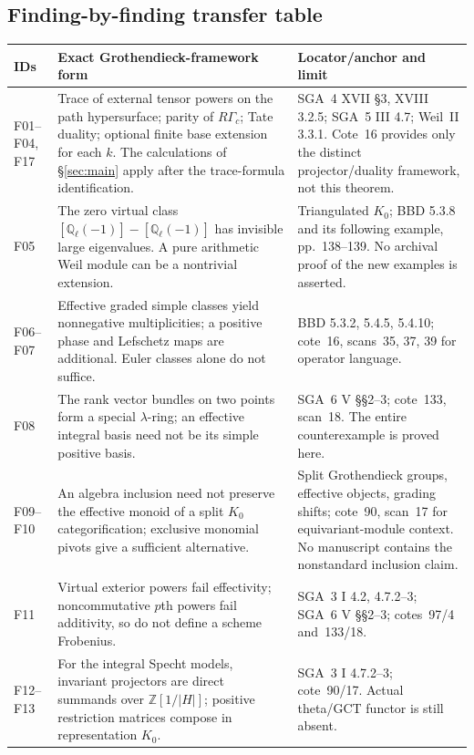 \documentclass[11pt,a4paper]{article}
\newcommand{\Q}{\mathbb Q}\newcommand{\Z}{\mathbb Z}\newcommand{\C}{\mathbb C}\newcommand{\N}{\mathbb N}\newcommand{\F}{\mathbb F}
\theoremstyle{named}\newtheorem{finding}{Finding}[section]
\theoremstyle{definition}\newtheorem{definition}[finding]{Definition}
\theoremstyle{remark}\newtheorem{remark}[finding]{Remark}
\begin{document}
\subsection{Finding-by-finding transfer table}
{\small\begin{longtable}{p{.12\linewidth}p{.48\linewidth}p{.32\linewidth}}
\toprule IDs&Exact Grothendieck-framework form&Locator/anchor and limit\\\midrule\endhead
F01--F04, F17&Trace of external tensor powers on the path hypersurface; parity of $R\Gamma_c$; Tate duality; optional finite base extension for each $k$. The calculations of \S\ref{sec:main} apply after the trace-formula identification.&SGA~4 XVII \S3, XVIII 3.2.5; SGA~5 III 4.7; Weil~II 3.3.1. Cote~16 provides only the distinct projector/duality framework, not this theorem.\\
F05&The zero virtual class $[\Q_\ell(-1)]-[\Q_\ell(-1)]$ has invisible large eigenvalues. A pure arithmetic Weil module can be a nontrivial extension.&Triangulated $K_0$; BBD 5.3.8 and its following example, pp.~138--139. No archival proof of the new examples is asserted.\\
F06--F07&Effective graded simple classes yield nonnegative multiplicities; a positive phase and Lefschetz maps are additional. Euler classes alone do not suffice.&BBD 5.3.2, 5.4.5, 5.4.10; cote~16, scans~35, 37, 39 for operator language.\\
F08&The rank vector bundles on two points form a special $\lambda$-ring; an effective integral basis need not be its simple positive basis.&SGA~6 V \S\S2--3; cote~133, scan~18. The entire counterexample is proved here.\\
F09--F10&An algebra inclusion need not preserve the effective monoid of a split $K_0$ categorification; exclusive monomial pivots give a sufficient alternative.&Split Grothendieck groups, effective objects, grading shifts; cote~90, scan~17 for equivariant-module context. No manuscript contains the nonstandard inclusion claim.\\
F11&Virtual exterior powers fail effectivity; noncommutative $p$th powers fail additivity, so do not define a scheme Frobenius.&SGA~3 I 4.2, 4.7.2--3; SGA~6 V \S\S2--3; cotes~97/4 and~133/18.\\
F12--F13&For the integral Specht models, invariant projectors are direct summands over $\Z[1/|H|]$; positive restriction matrices compose in representation $K_0$.&SGA~3 I 4.7.2--3; cote~90/17. Actual theta/GCT functor is still absent.\\

\end{longtable}}
\end{document}
